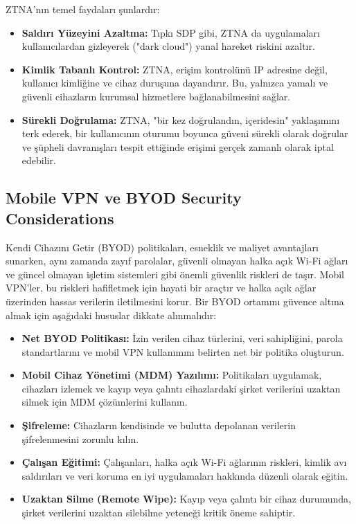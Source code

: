 ZTNA'nın temel faydaları şunlardır:

\begin{itemize}
\item \textbf{Saldırı Yüzeyini Azaltma:} Tıpkı SDP gibi, ZTNA da uygulamaları kullanıcılardan gizleyerek ("dark cloud") yanal hareket riskini azaltır.
\item \textbf{Kimlik Tabanlı Kontrol:} ZTNA, erişim kontrolünü IP adresine değil, kullanıcı kimliğine ve cihaz duruşuna dayandırır. Bu, yalnızca yamalı ve güvenli cihazların kurumsal hizmetlere bağlanabilmesini sağlar.
\item \textbf{Sürekli Doğrulama:} ZTNA, "bir kez doğrulandın, içeridesin" yaklaşımını terk ederek, bir kullanıcının oturumu boyunca güveni sürekli olarak doğrular ve şüpheli davranışları tespit ettiğinde erişimi gerçek zamanlı olarak iptal edebilir.
\end{itemize}

\subsection{Mobile VPN ve BYOD Security Considerations}

Kendi Cihazını Getir (BYOD) politikaları, esneklik ve maliyet avantajları sunarken, aynı zamanda zayıf parolalar, güvenli olmayan halka açık Wi-Fi ağları ve güncel olmayan işletim sistemleri gibi önemli güvenlik riskleri de taşır. Mobil VPN'ler, bu riskleri hafifletmek için hayati bir araçtır ve halka açık ağlar üzerinden hassas verilerin iletilmesini korur.
Bir BYOD ortamını güvence altına almak için aşağıdaki hususlar dikkate alınmalıdır:

\begin{itemize}
\item \textbf{Net BYOD Politikası:} İzin verilen cihaz türlerini, veri sahipliğini, parola standartlarını ve mobil VPN kullanımını belirten net bir politika oluşturun.
\item \textbf{Mobil Cihaz Yönetimi (MDM) Yazılımı:} Politikaları uygulamak, cihazları izlemek ve kayıp veya çalıntı cihazlardaki şirket verilerini uzaktan silmek için MDM çözümlerini kullanın.
\item \textbf{Şifreleme:} Cihazların kendisinde ve bulutta depolanan verilerin şifrelenmesini zorunlu kılın.
\item \textbf{Çalışan Eğitimi:} Çalışanları, halka açık Wi-Fi ağlarının riskleri, kimlik avı saldırıları ve veri koruma en iyi uygulamaları hakkında düzenli olarak eğitin.
\item \textbf{Uzaktan Silme (Remote Wipe):} Kayıp veya çalıntı bir cihaz durumunda, şirket verilerini uzaktan silebilme yeteneği kritik öneme sahiptir.
\end{itemize}

